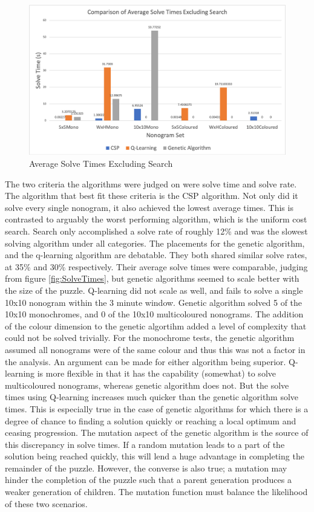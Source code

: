 \documentclass{svproc}
\begin{document}
\begin{figure}[h]
    \centering
    \includegraphics[width=\textwidth]{SolveTimesShort.png}
    \caption{Average Solve Times Excluding Search}
    \label{fig:SolveTimesShort}
\end{figure}
\clearpage

The two criteria the algorithms were judged on were solve time and solve rate. The algorithm that best fit these criteria is the CSP algorithm.
Not only did it solve every single nonogram, it also achieved the lowest average times.
This is contrasted to arguably the worst performing algorithm, which is the uniform cost search.
Search only accomplished a solve rate of roughly 12\% and was the slowest solving algorithm under all categories.
The placements for the genetic algorithm, and the q-learning algorithm are debatable.
They both shared similar solve rates, at 35\% and 30\% respectively.
Their average solve times were comparable, judging from figure \ref{fig:SolveTimes}, but genetic algorithms seemed to scale better with the size of the puzzle.
Q-learning did not scale as well, and fails to solve a single 10x10 nonogram within the 3 minute window.
Genetic algorithm solved 5 of the 10x10 monochromes, and 0 of the 10x10 multicoloured nonograms. The addition of the colour dimension to the genetic algortihm added a level of complexity that could not be solved trivially. For the monochrome tests, the genetic algorithm assumed all nonograms were of the same colour and thus this was not a factor in the analysis.
An argument can be made for either algorithm being superior. Q-learning is more flexible in that it has the capability (somewhat) to solve multicoloured nonograms, whereas genetic algorithm does not. But the solve times using Q-learning increases much quicker than the genetic algorithm solve times. This is especially true in the case of genetic algorithms for which there is a degree of chance to finding a solution quickly or reaching a local optimum and ceasing progression. The mutation aspect of the genetic algorithm is the source of this discrepancy in solve times. If a random mutation leads to a part of the solution being reached quickly, this will lend a huge advantage in completing the remainder of the puzzle. However, the converse is also true; a mutation may hinder the completion of the puzzle such that a parent generation produces a weaker generation of children. The mutation function must balance the likelihood of these two scenarios.
\end{document}
